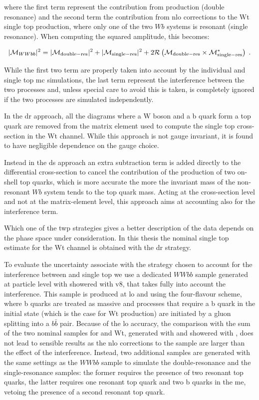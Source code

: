 \noindent where the first term represent the contribution from \ttbar production (double resonance) and the second term the contribution from 
\gls{nlo} corrections to the Wt single top production, where only one of the two $Wb$ systems is resonant (single resonance). 
When computing the squared amplitude, this becomes:

\begin{equation}
|\mathcal{M}_{WWbb}|^2 = |\mathcal{M}_{\rm{double-res}}|^2 + |\mathcal{M}_{\rm{single-res}}|^2 + 2 \mathcal{R}\left(\mathcal{M}_{\rm{double-res}}\times \mathcal{M}_{\rm{single-res}}^* \right) \; .
\end{equation}

While the first two term are properly taken into account by the individual \ttbar and single top \gls{mc} simulations, 
the last term represent the interference between the two processes and, unless special care to avoid this is taken, is completely ignored if the two processes are simulated independently. 

In the \gls{dr} approach, all the diagrams where a W boson and a b quark form a top quark are removed from the matrix element used to compute the single top cross-section in the Wt channel. While this approach is not gauge invariant, it is found to have negligible dependence on the gauge choice.

Instead in the \gls{ds} approach an extra subtraction term is added directly to the differential cross-section to cancel the contribution of the 
production of two on-shell top quarks, which is more accurate the more the invariant mass of the non-resonant $Wb$ system tends to the top quark mass. 
Acting at the cross-section level and not at the matrix-element level, this approach aims at accounting also for the interference term. 

Which one of the twp strategies gives a better description of the data depends on the phase space under consideration. 
In this thesis the nominal single top estimate for the Wt channel is obtained with the \gls{dr} strategy.  

To evaluate the uncertainty associate with the strategy chosen to account for the interference between \ttbar and single top
we use a dedicated $WWbb$ sample generated at particle level with \aNLO showered with \PY v8, that takes fully into account the interference.
This sample is produced at \gls{lo} and using the four-flavour scheme, where b quarks are treated as massive and processes that require a b quark in the initial state (which is the case for Wt production) are initiated by a gluon splitting into a $b\bar{b}$ pair. 
Because of the \gls{lo} accuracy, the comparison with the sum of the two nominal samples for \ttbar and Wt, generated with \PowhegBox and showered with \PY, does not lead to sensible 
results as the \gls{nlo} corrections to the \ttbar sample are larger than the effect of the interference. 
Instead, two additional samples are generated with the same settings as the $WWbb$ sample to simulate the double-resonance and the single-resonance samples: the former requires the presence of two resonant top quarks, the latter requires one resonant top quark and two b quarks in the \gls{me}, vetoing the presence of a second resonant top quark.  


